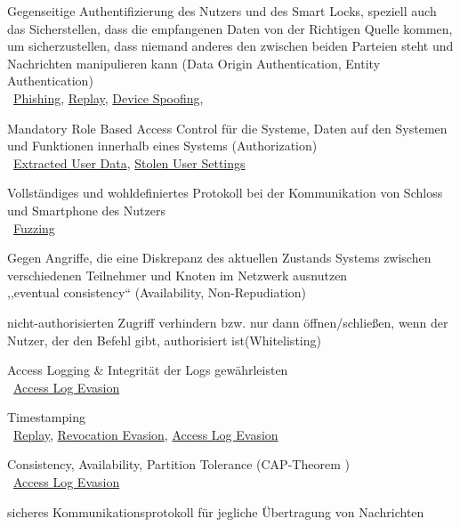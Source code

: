     \begin{SA}[noitemsep]
        \item \label{sa:1}Gegenseitige Authentifizierung des Nutzers und des Smart Locks, speziell auch das Sicherstellen, dass die empfangenen Daten von der Richtigen Quelle kommen, um sicherzustellen, dass niemand anderes den zwischen beiden Parteien steht und Nachrichten manipulieren kann (Data Origin Authentication, Entity Authentication)\\
            \textrightarrow\ \hyperref[vuln:phishing]{Phishing}, \hyperref[vuln:replay]{Replay}, \hyperref[vuln:spoofing]{Device Spoofing}, 
        \item \label{sa:2}Mandatory Role Based Access Control für die Systeme, Daten auf den Systemen und Funktionen innerhalb eines Systems (Authorization) \cite{Miessler2015}\\ 
            \textrightarrow\ \hyperref[vuln:userdata]{Extracted User Data}, \hyperref[vuln:usersettings]{Stolen User Settings}
        \item \label{sa:3}Vollständiges und wohldefiniertes Protokoll bei der Kommunikation von Schloss und Smartphone des Nutzers\\
            \textrightarrow\ \hyperref[vuln:fuzzing]{Fuzzing}
        \item \label{sa:4}Gegen Angriffe, die eine Diskrepanz des aktuellen Zustands Systems zwischen verschiedenen Teilnehmer und Knoten im Netzwerk ausnutzen\\
            \textrightarrow ,,eventual consistency`` (Availability, Non-Repudiation)\cite{Ho2016}
        \item \label{sa:5}nicht-authorisierten Zugriff verhindern bzw. nur dann öffnen/schließen, wenn der Nutzer, der den Befehl gibt, authorisiert ist(Whitelisting) \cite{Ho2016}
        \item \label{sa:6}Access Logging \& Integrität der Logs gewährleisten\\
            \textrightarrow\ \hyperref[vuln:accesslogevasion]{Access Log Evasion}
        \item \label{sa:7}Timestamping\\
            \textrightarrow\ \hyperref[vuln:replay]{Replay}, \hyperref[vuln:revocationevasion]{Revocation Evasion}, \hyperref[vuln:accesslogevasion]{Access Log Evasion}
        \item \label{sa:8}Consistency, Availability, Partition Tolerance (CAP-Theorem \cite{Brewer2012})\\
            \textrightarrow\ \hyperref[vuln:accesslogevasion]{Access Log Evasion}
        \item sicheres Kommunikationsprotokoll für jegliche Übertragung von Nachrichten\cite{Miessler,Ye2017}
    \end{SA}
